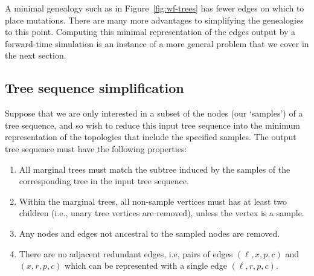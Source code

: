 \documentclass{article}
\begin{document}
A minimal genealogy such as in Figure~\ref{fig:wf-trees}
has fewer edges on which to place mutations.
There are many more advantages to simplifying the genealogies to this point.
Computing this minimal representation of the
edges output by a forward-time simulation is an instance of a more
general problem that we cover in the next section.


\subsection*{Tree sequence simplification}

Suppose that we are only interested in a subset of the nodes (our `samples')
of a tree sequence,
and so wish to reduce this input tree sequence
into the minimum representation of the topologies that include the specified
samples. The output tree sequence must have the following properties:
\begin{enumerate}
\item All marginal trees must match the subtree induced by the samples of the corresponding tree in the input tree sequence.
\item Within the marginal trees, all non-sample vertices must has at least
two children (i.e., unary tree vertices are removed), unless the vertex is a sample.
\item Any nodes and edges not ancestral to the sampled nodes are removed.
\item There are no adjacent redundant edges, i.e, pairs of edges $(\ell, x, p,
c)$ and $(x, r, p, c)$ which can be represented with a single edge
$(\ell, r, p, c)$.
\end{enumerate}
\end{document}
